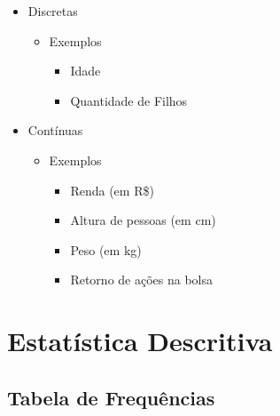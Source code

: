 \documentclass[
  letterpaper,
  DIV=11,
  numbers=noendperiod]{scrreprt}
\providecommand{\tightlist}{%
  \setlength{\itemsep}{0pt}\setlength{\parskip}{0pt}}\usepackage{longtable,booktabs,array}
\begin{document}
\begin{itemize}
\tightlist
\item
  Discretas

  \begin{itemize}
  \tightlist
  \item
    Exemplos

    \begin{itemize}
    \tightlist
    \item
      Idade
    \item
      Quantidade de Filhos
    \end{itemize}
  \end{itemize}
\item
  Contínuas

  \begin{itemize}
  \tightlist
  \item
    Exemplos

    \begin{itemize}
    \tightlist
    \item
      Renda (em R\$)
    \item
      Altura de pessoas (em cm)
    \item
      Peso (em kg)
    \item
      Retorno de ações na bolsa
    \end{itemize}
  \end{itemize}
\end{itemize}

\hypertarget{estatuxedstica-descritiva}{%
\section{Estatística Descritiva}\label{estatuxedstica-descritiva}}

\hypertarget{tabela-de-frequuxeancias}{%
\subsection{Tabela de Frequências}\label{tabela-de-frequuxeancias}}
\end{document}
